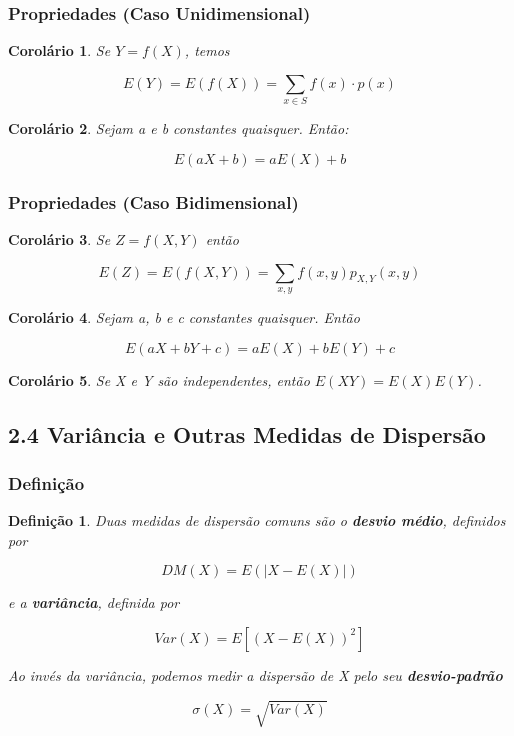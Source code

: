 \documentclass[12pt]{article}
\newtheorem{corollary}{Corolário}[theorem]
\newtheorem{definition}{Definição}
\begin{document}
\subsubsection*{Propriedades (Caso Unidimensional)}
\begin{corollary}
Se $Y = f(X)$, temos

$$E(Y) = E(f(X)) = \sum_{x \in S} f(x) \cdot p(x)$$
\end{corollary}

\begin{corollary}
Sejam a e b constantes quaisquer. Então:

$$E(a X + b) = a E(X) + b$$
\end{corollary}

\subsubsection*{Propriedades (Caso Bidimensional)}
\begin{corollary}
Se $Z = f(X, Y)$ então

$$E(Z) = E(f(X, Y)) = \sum_{x, y} f(x, y) p_{X, Y} (x, y)$$
\end{corollary}

\begin{corollary}
Sejam a, b e c constantes quaisquer. Então

$$E(a X + b Y + c) = a E(X) + b E(Y) + c$$
\end{corollary}

\begin{corollary}
Se X e Y são independentes, então $E(X Y) = E(X) E(Y)$.
\end{corollary}

\subsection*{2.4 Variância e Outras Medidas de Dispersão}
\subsubsection*{Definição}

\begin{definition}
    Duas medidas de dispersão comuns são o \textbf{desvio médio}, definidos por
    
    $$D M (X) = E(|X - E(X)|)$$
    
    e a \textbf{variância}, definida por
    
    $$Var(X) = E[(X - E(X))^2]$$
    
    Ao invés da variância, podemos medir a dispersão de X pelo seu \textbf{desvio-padrão}
    
    $$\sigma (X) = \sqrt{Var(X)}$$
\end{definition}
\end{document}

